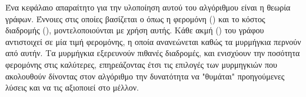 Ένα κεφάλαιο απαραίτητο για την υλοποίηση αυτού του αλγόριθμου είναι η θεωρία γράφων. Έννοιες στις οποίες βασίζεται ο  όπως η φερομόνη () και το κόστος διαδρομής (), μοντελοποιούνται με χρήση αυτής. Κάθε ακμή () του γράφου αντιστοιχεί σε μία τιμή φερομόνης, η οποία ανανεώνεται καθώς τα μυρμήγκια περνούν από αυτήν. Τα μυρμήγκια εξερευνούν πιθανές διαδρομές, και ενισχύουν την ποσότητα φερομόνης στις καλύτερες, επηρεάζοντας έτσι τις επιλογές των μυρμηγκιών που ακολουθούν δίνοντας στον αλγόριθμο την δυνατότητα να "θυμάται" προηγούμενες λύσεις και να τις αξιοποιεί στο μέλλον. 


\begin{flushright} 
    \cite{dorigo2004ant}
\end{flushright}

